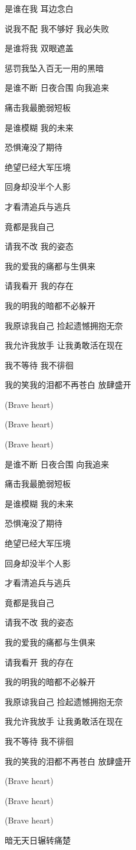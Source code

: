 \documentclass[]{ctexbook}
\begin{document}
是谁在我 耳边念白

说我不配 我不够好 我必失败

是谁将我 双眼遮盖

惩罚我坠入百无一用的黑暗

是谁不断 日夜合围 向我追来

痛击我最脆弱短板

是谁模糊 我的未来

恐惧淹没了期待

绝望已经大军压境

回身却没半个人影

才看清追兵与逃兵

竟都是我自己

请我不改 我的姿态

我的爱我的痛都与生俱来

请我看开 我的存在

我的明我的暗都不必躲开

我原谅我自己 捡起遗憾拥抱无奈

我允许我放手 让我勇敢活在现在

我不等待 我不徘徊

我的笑我的泪都不再苍白 放肆盛开

(Brave heart)

(Brave heart)

(Brave heart)

是谁不断 日夜合围 向我追来

痛击我最脆弱短板

是谁模糊 我的未来

恐惧淹没了期待

绝望已经大军压境

回身却没半个人影

才看清追兵与逃兵

竟都是我自己

请我不改 我的姿态

我的爱我的痛都与生俱来

请我看开 我的存在

我的明我的暗都不必躲开

我原谅我自己 捡起遗憾拥抱无奈

我允许我放手 让我勇敢活在现在

我不等待 我不徘徊

我的笑我的泪都不再苍白 放肆盛开

(Brave heart)

(Brave heart)

(Brave heart)

暗无天日辗转痛楚
\end{document}
